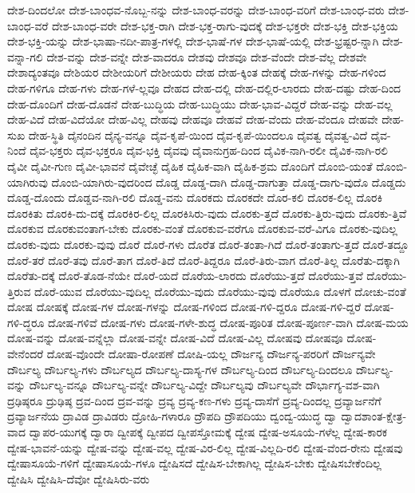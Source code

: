 {ದೇಶ-ದಿಂದಲೋ
ದೇಶ-ಬಾಂಧವ-ನೊಬ್ಬ-ನನ್ನು
ದೇಶ-ಬಾಂಧ-ವರನ್ನು
ದೇಶ-ಬಾಂಧ-ವರಿಗೆ
ದೇಶ-ಬಾಂಧ-ವರು
ದೇಶ-ಬಾಂಧ-ವರೆ
ದೇಶ-ಬಾಂಧ-ವರೇ
ದೇಶ-ಭಕ್ತ-ರಾಗಿ
ದೇಶ-ಭಕ್ತ-ರಾಗು-ವುದಕ್ಕೆ
ದೇಶ-ಭಕ್ತರೇ
ದೇಶ-ಭಕ್ತಿ
ದೇಶ-ಭಕ್ತಿಯ
ದೇಶ-ಭಕ್ತಿ-ಯನ್ನು
ದೇಶ-ಭಾಷಾ-ನದೀ-ಪಾತ್ರ-ಗಳಲ್ಲಿ
ದೇಶ-ಭಾಷೆ-ಗಳ
ದೇಶ-ಭಾಷೆ-ಯಲ್ಲಿ
ದೇಶ-ಭ್ರಷ್ಟರ-ನ್ನಾಗಿ
ದೇಶ-ವನ್ನಾ-ಗಲಿ
ದೇಶ-ವನ್ನು
ದೇಶ-ವನ್ನೇ
ದೇಶ-ವಾದರೂ
ದೇಶವು
ದೇಶವೂ
ದೇಶ-ವೆಂದೇ
ದೇಶ-ವೆಲ್ಲ
ದೇಶವೇ
ದೇಶಾದ್ಯಂತವೂ
ದೇಶಿಯರ
ದೇಶೀಯರಿಗೆ
ದೇಶೀಯರು
ದೇಹ
ದೇಹ-ಕ್ಕಿಂತ
ದೇಹಕ್ಕೆ
ದೇಹ-ಗಳನ್ನು
ದೇಹ-ಗಳಿಂದ
ದೇಹ-ಗಳಿಗೂ
ದೇಹ-ಗಳು
ದೇಹ-ಗಳೆ-ಲ್ಲವೂ
ದೇಹದ
ದೇಹ-ದಲ್ಲಿ
ದೇಹ-ದಲ್ಲಿರ-ಲಾರದು
ದೇಹ-ದಷ್ಟು
ದೇಹ-ದಿಂದ
ದೇಹ-ದೊಂದಿಗೆ
ದೇಹ-ದೊಡನೆ
ದೇಹ-ಬುದ್ಧಿಯ
ದೇಹ-ಬುದ್ಧಿಯು
ದೇಹ-ಭಾವ-ವಿದ್ದರೆ
ದೇಹ-ವನ್ನು
ದೇಹ-ವಲ್ಲ
ದೇಹ-ವಿದೆ
ದೇಹ-ವಿದೆಯೋ
ದೇಹ-ವಿಲ್ಲ
ದೇಹವು
ದೇಹವೂ
ದೇಹವೆ
ದೇಹ-ವೆಂದು
ದೇಹ-ವೆಂದೂ
ದೇಹವೇ
ದೇಹ-ಸುಖ
ದೇಹ-ಸ್ಥಿತಿ
ದೈನಂದಿನ
ದೈನ್ಯ-ವನ್ನೂ
ದೈವ-ಕೃಪೆ-ಯಿಂದ
ದೈವ-ಕೃಪೆ-ಯಿಂದಲೂ
ದೈವತ್ವ
ದೈವತ್ವ-ವಿದೆ
ದೈವ-ನಿಂದೆ
ದೈವ-ಭಕ್ತರು
ದೈವ-ಭಕ್ತರೂ
ದೈವ-ಭಕ್ತಿ
ದೈವವು
ದೈವಾನುಗ್ರಹ-ದಿಂದ
ದೈವಿಕ-ನಾಗಿ-ರಲೀ
ದೈವಿಕ-ನಾಗಿ-ರಲಿ
ದೈವೀ
ದೈವೀ-ಗುಣ
ದೈವೀ-ಭಾವನೆ
ದೈವೇಚ್ಛೆ
ದೈಹಿಕ
ದೈಹಿಕ-ವಾಗಿ
ದೈಹಿಕ-ಶ್ರಮ
ದೊಂದಿಗೆ
ದೊಂಬಿ-ಯಂತೆ
ದೊಂಬಿ-ಯಾಗಿರುವು
ದೊಂಬಿ-ಯಾಗಿರು-ವುದರಿಂದ
ದೊಡ್ಡ
ದೊಡ್ಡ-ದಾಗಿ
ದೊಡ್ಡ-ದಾಗುತ್ತಾ
ದೊಡ್ಡ-ದಾಗು-ವುದೊ
ದೊಡ್ಡದು
ದೊಡ್ಡ-ದೊಂದು
ದೊಡ್ಡವ-ನಾಗಿ-ರಲಿ
ದೊಡ್ಡ-ವನು
ದೊರಕದು
ದೊರಕದೇ
ದೊರ-ಕಲಿ
ದೊರಕ-ಲಿಲ್ಲ
ದೊರಕಿ
ದೊರಕಿತು
ದೊರಕಿ-ದು-ದಕ್ಕೆ
ದೊರಕಿರ-ಲಿಲ್ಲ
ದೊರಕಿಸಿರು-ವುದು
ದೊರಕು-ತ್ತದೆ
ದೊರಕು-ತ್ತಿರು-ವುದು
ದೊರಕು-ತ್ತಿವೆ
ದೊರಕುವ
ದೊರಕುವಂತಾಗ-ಬೇಕು
ದೊರಕು-ವಂತೆ
ದೊರಕುವ-ವರೆಗೂ
ದೊರಕುವ-ವರೆ-ವಿಗೂ
ದೊರಕು-ವುದಿಲ್ಲ
ದೊರಕು-ವುದು
ದೊರಕು-ವುವು
ದೊರೆ
ದೊರೆ-ಗಳು
ದೊರೆತ
ದೊರೆ-ತಂತಾ-ಗಿದೆ
ದೊರೆ-ತಂತಾಗು-ತ್ತದೆ
ದೊರೆ-ತದ್ದೂ
ದೊರೆ-ತರೆ
ದೊರೆ-ತವು
ದೊರೆ-ತಾಗ
ದೊರೆ-ತಿದೆ
ದೊರೆ-ತಿದ್ದರೂ
ದೊರೆ-ತಿರು-ವಾಗ
ದೊರೆ-ತಿಲ್ಲ
ದೊರೆತು-ದಕ್ಕಾಗಿ
ದೊರೆತು-ದಕ್ಕೆ
ದೊರೆ-ತೊಡ-ನೆಯೇ
ದೊರೆ-ಯದೆ
ದೊರೆಯ-ಲಾರದು
ದೊರೆಯು-ತ್ತದೆ
ದೊರೆಯು-ತ್ತವೆ
ದೊರೆಯು-ತ್ತಿರುವ
ದೊರೆ-ಯುವ
ದೊರೆಯು-ವುದಿಲ್ಲ
ದೊರೆಯು-ವುದು
ದೊರೆಯು-ವುವು
ದೊರೆಯೂ
ದೊಳಗೆ
ದೋಚು-ವಂತೆ
ದೋಷ
ದೋಷಕ್ಕೆ
ದೋಷ-ಗಳ
ದೋಷ-ಗಳನ್ನು
ದೋಷ-ಗಳಿಂದ
ದೋಷ-ಗಳಿ-ದ್ದರೂ
ದೋಷ-ಗಳಿ-ದ್ದರೆ
ದೋಷ-ಗಳಿ-ದ್ಧರೂ
ದೋಷ-ಗಳಿವೆ
ದೋಷ-ಗಳು
ದೋಷ-ಗಳೇ-ಶುದ್ಧ
ದೋಷ-ಪೂರಿತ
ದೋಷ-ಪೂರ್ಣ-ವಾಗಿ
ದೋಷ-ಮಯ
ದೋಷ-ವನ್ನು
ದೋಷ-ವನ್ನೆಲ್ಲಾ
ದೋಷ-ವನ್ನೇ
ದೋಷ-ವಿದೆ
ದೋಷ-ವಿಲ್ಲ
ದೋಷವು
ದೋಷವೂ
ದೋಷ-ವೇನೆಂದರೆ
ದೋಷ-ವೊಂದೇ
ದೋಷಾ-ರೋಪಣೆ
ದೋಷಿ-ಯಲ್ಲ
ದೌರ್ಜನ್ಯ
ದೌರ್ಜನ್ಯ-ಪರರಿಗೆ
ದೌರ್ಜನ್ಯವೇ
ದೌರ್ಬಲ್ಯ
ದೌರ್ಬಲ್ಯ-ಗಳು
ದೌರ್ಬಲ್ಯದ
ದೌರ್ಬಲ್ಯ-ದಾಸ್ಯ-ಗಳ
ದೌರ್ಬಲ್ಯ-ದಿಂದ
ದೌರ್ಬಲ್ಯ-ದಿಂದಲೂ
ದೌರ್ಬಲ್ಯ-ವನ್ನು
ದೌರ್ಬಲ್ಯ-ವನ್ನೂ
ದೌರ್ಬಲ್ಯ-ವನ್ನೇ
ದೌರ್ಬಲ್ಯ-ವಿದ್ದೇ
ದೌರ್ಬಲ್ಯವು
ದೌರ್ಬಲ್ಯವೇ
ದೌರ್ಭಾಗ್ಯ-ವಶ-ವಾಗಿ
ದ್ರಢಿಷ್ಠರೂ
ದ್ರುಢಿಷ್ಠ
ದ್ರವ-ದಿಂದ
ದ್ರವ-ವನ್ನು
ದ್ರವ್ಯ
ದ್ರವ್ಯ-ಕಣ-ಗಳು
ದ್ರವ್ಯ-ದಾಸೆಗೆ
ದ್ರವ್ಯ-ದಿಂದಲ್ಲ
ದ್ರವ್ಯಾರ್ಜನೆಗೆ
ದ್ರವ್ಯಾರ್ಜನೆಯ
ದ್ರಾವಿಡ
ದ್ರಾವಿಡರು
ದ್ರೋಹಿ-ಗಳಾರೂ
ದ್ರೌಪದಿ
ದ್ರೌಪದಿಯು
ದ್ವಂದ್ವ-ಯುದ್ಧ
ದ್ವಾ
ದ್ವಾದಶಾಂತ-ಕ್ಷೇತ್ರ-ವಾದ
ದ್ವಾಪರ-ಯುಗಕ್ಕೆ
ದ್ವಾರಾ
ದ್ವೀಪಕ್ಕೆ
ದ್ವೀಪದ
ದ್ವೀಪಸ್ತೋಮಕ್ಕೆ
ದ್ವೇಷ
ದ್ವೇಷ-ಅಸೂಯೆ-ಗಳೆಲ್ಲ
ದ್ವೇಷ-ಕಾರಕ
ದ್ವೇಷ-ಭಾವನೆ-ಯನ್ನು
ದ್ವೇಷ-ವನ್ನು
ದ್ವೇಷ-ವಲ್ಲ
ದ್ವೇಷ-ವಿರ-ಲಿಲ್ಲ
ದ್ವೇಷ-ವಿಲ್ಲದಿ-ರಲಿ
ದ್ವೇಷ-ವೆಂದ-ರೇನು
ದ್ವೇಷವು
ದ್ವೇಷಾಸೂಯೆ-ಗಳಿಗೆ
ದ್ವೇಷಾಸೂಯೆ-ಗಳೂ
ದ್ವೇಷಿಸದೆ
ದ್ವೇಷಿಸ-ಬೇಕಾಗಿಲ್ಲ
ದ್ವೇಷಿಸ-ಬೇಕು
ದ್ವೇಷಿಸಬೇಕೆಂದಿಲ್ಲ
ದ್ವೇಷಿಸಿ
ದ್ವೇಷಿಸಿ-ದೆವೋ
ದ್ವೇಷಿಸಿರು-ವರು
}
